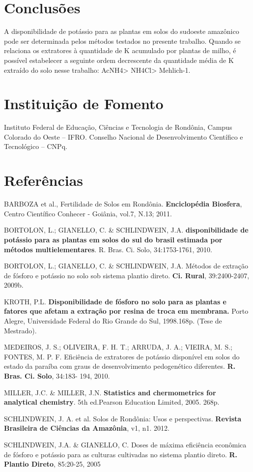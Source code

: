 \documentclass[article,12pt,onesidea,4paper,english,brazil]{abntex2}
\begin{document}
	\section*{Conclusões}
	
	A disponibilidade de potássio para as plantas em solos do sudoeste amazônico pode ser determinada pelos métodos testados no presente trabalho.
	Quando se relaciona os extratores à quantidade de K acumulado por plantas de milho, é possível estabelecer a seguinte ordem decrescente da quantidade média de K extraído do solo nesse trabalho: AcNH4> NH4Cl> Mehlich-1.
	
	\section*{Instituição de Fomento}
	
	Instituto Federal de Educação, Ciências e Tecnologia de Rondônia, Campus
	Colorado do Oeste – IFRO.
	Conselho Nacional de Desenvolvimento Científico e Tecnológico – CNPq.
	
	\section*{Referências}
	
	BARBOZA et al., Fertilidade de Solos em Rondônia. \textbf{Enciclopédia Biosfera}, Centro Científico Conhecer - Goiânia, vol.7, N.13; 2011.
	
	BORTOLON, L.; GIANELLO, C. \& SCHLINDWEIN, J.A. \textbf{disponibilidade de potássio para as plantas em solos do sul do brasil estimada por métodos multielementares}. R. Bras. Ci. Solo, 34:1753-1761, 2010.
	
	BORTOLON, L.; GIANELLO, C. \& SCHLINDWEIN, J.A. Métodos de extração de fósforo e potássio no solo sob sistema plantio direto. \textbf{Ci. Rural}, 39:2400-2407, 2009b.
	
	KROTH, P.L. \textbf{Disponibilidade de fósforo no solo para as plantas e fatores que afetam a extração por resina de troca em membrana.} Porto Alegre, Universidade Federal do Rio Grande do Sul, 1998.168p. (Tese de Mestrado).
	
	MEDEIROS, J. S.; OLIVEIRA, F. H. T.; ARRUDA, J. A.; VIEIRA, M. S.; FONTES, M.
	P. F. Eficiência de extratores de potássio disponível em solos do estado da paraíba com graus de desenvolvimento pedogenético diferentes. \textbf{R. Bras. Ci. Solo}, 34:183- 194, 2010.
	
	MILLER, J.C. \& MILLER, J.N. \textbf{Statistics and chermometrics for analytical chemistry}. 5th ed.Pearson Education Limited, 2005. 268p.
	
	SCHLINDWEIN, J. A. et al. Solos de Rondônia: Usos e perspectivas. \textbf{Revista Brasileira de Ciências da Amazônia}, v1, n1. 2012.
	
	SCHLINDWEIN, J.A. \& GIANELLO, C. Doses de máxima eficiência econômica de fósforo e potássio para as culturas cultivadas no sistema plantio direto. \textbf{R. Plantio Direto}, 85:20-25, 2005
	
\end{document}
